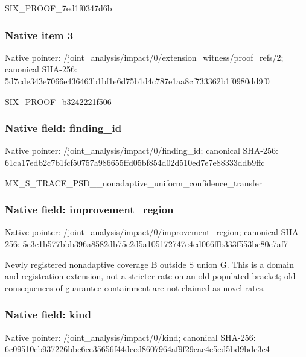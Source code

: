 \documentclass[10pt,a4paper]{article}
\begin{document}
\begingroup\raggedright\sloppy SIX\_\allowbreak{}PROOF\_\allowbreak{}7ed1f0347d6b\par\endgroup

\subsubsection{Native item 3}
Native pointer: /joint\_\allowbreak{}analysis/impact/0/extension\_\allowbreak{}witness/proof\_\allowbreak{}refs/2; canonical SHA-256: 5d7cde343e7066e436463b1bf1e6d75b1d4c787e1aa8cf733362b1f0980dd9f0

\begingroup\raggedright\sloppy SIX\_\allowbreak{}PROOF\_\allowbreak{}b3242221f506\par\endgroup

\subsubsection{Native field: finding\_\allowbreak{}id}
Native pointer: /joint\_\allowbreak{}analysis/impact/0/finding\_\allowbreak{}id; canonical SHA-256: 61ca17edb2c7b1fcf50757a986655ffd05bf854d02d510ed7e7e88333ddb9ffc

\begingroup\raggedright\sloppy MX\_\allowbreak{}S\_\allowbreak{}TRACE\_\allowbreak{}PSD\_\allowbreak{}\_\allowbreak{}nonadaptive\_\allowbreak{}uniform\_\allowbreak{}confidence\_\allowbreak{}transfer\par\endgroup

\subsubsection{Native field: improvement\_\allowbreak{}region}
Native pointer: /joint\_\allowbreak{}analysis/impact/0/improvement\_\allowbreak{}region; canonical SHA-256: 5c3c1b577bbb396a8582db75c2d5a105172747c4ed066ffb333f553bc80c7af7

\begingroup\raggedright\sloppy Newly registered nonadaptive coverage B outside S union G. This is a domain and registration extension,\allowbreak{} not a stricter rate on an old populated bracket;\allowbreak{} old consequences of guarantee containment are not claimed as novel rates.\par\endgroup

\subsubsection{Native field: kind}
Native pointer: /joint\_\allowbreak{}analysis/impact/0/kind; canonical SHA-256: 6c09510eb937226bbc6ce35656f44dccd8607964af9f29cac4e5cd5bd9bdc3c4
\end{document}
